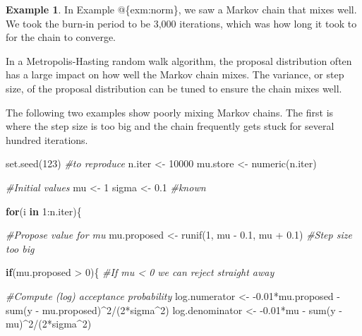 \documentclass[
]{book}
\newenvironment{Shaded}{\begin{snugshade}}{\end{snugshade}}
\newcommand{\CommentTok}[1]{\textcolor[rgb]{0.56,0.35,0.01}{\textit{#1}}}
\newcommand{\ControlFlowTok}[1]{\textcolor[rgb]{0.13,0.29,0.53}{\textbf{#1}}}
\newcommand{\DecValTok}[1]{\textcolor[rgb]{0.00,0.00,0.81}{#1}}
\newcommand{\FloatTok}[1]{\textcolor[rgb]{0.00,0.00,0.81}{#1}}
\newcommand{\FunctionTok}[1]{\textcolor[rgb]{0.00,0.00,0.00}{#1}}
\newcommand{\NormalTok}[1]{#1}
\newcommand{\OtherTok}[1]{\textcolor[rgb]{0.56,0.35,0.01}{#1}}
\newcommand{\SpecialCharTok}[1]{\textcolor[rgb]{0.00,0.00,0.00}{#1}}
\theoremstyle{definition}
\theoremstyle{definition}
\newtheorem{example}{Example}[chapter]
\theoremstyle{definition}
\theoremstyle{definition}
\theoremstyle{remark}
\begin{document}
\begin{example}
In Example @\{exm:norm\}, we saw a Markov chain that mixes well. We took the burn-in period to be 3,000 iterations, which was how long it took to for the chain to converge.

In a Metropolis-Hasting random walk algorithm, the proposal distribution often has a large impact on how well the Markov chain mixes. The variance, or step size, of the proposal distribution can be tuned to ensure the chain mixes well.

The following two examples show poorly mixing Markov chains. The first is where the step size is too big and the chain frequently gets stuck for several hundred iterations.

\begin{Shaded}
\begin{Highlighting}[]
\FunctionTok{set.seed}\NormalTok{(}\DecValTok{123}\NormalTok{) }\CommentTok{\#to reproduce}
\NormalTok{n.iter   }\OtherTok{\textless{}{-}} \DecValTok{10000}
\NormalTok{mu.store }\OtherTok{\textless{}{-}} \FunctionTok{numeric}\NormalTok{(n.iter)}

\CommentTok{\#Initial values}
\NormalTok{mu }\OtherTok{\textless{}{-}} \DecValTok{1} 
\NormalTok{sigma }\OtherTok{\textless{}{-}} \FloatTok{0.1} \CommentTok{\#known}

\ControlFlowTok{for}\NormalTok{(i }\ControlFlowTok{in} \DecValTok{1}\SpecialCharTok{:}\NormalTok{n.iter)\{}
  
  \CommentTok{\#Propose value for mu}
\NormalTok{  mu.proposed }\OtherTok{\textless{}{-}} \FunctionTok{runif}\NormalTok{(}\DecValTok{1}\NormalTok{, mu }\SpecialCharTok{{-}} \FloatTok{0.1}\NormalTok{, mu }\SpecialCharTok{+} \FloatTok{0.1}\NormalTok{) }\CommentTok{\#Step size too big}
  
  \ControlFlowTok{if}\NormalTok{(mu.proposed }\SpecialCharTok{\textgreater{}} \DecValTok{0}\NormalTok{)\{ }\CommentTok{\#If mu \textless{} 0 we can reject straight away}
    
    \CommentTok{\#Compute (log) acceptance probability}
\NormalTok{    log.numerator   }\OtherTok{\textless{}{-}} \SpecialCharTok{{-}}\FloatTok{0.01}\SpecialCharTok{*}\NormalTok{mu.proposed }\SpecialCharTok{{-}} \FunctionTok{sum}\NormalTok{(y }\SpecialCharTok{{-}}\NormalTok{ mu.proposed)}\SpecialCharTok{\^{}}\DecValTok{2}\SpecialCharTok{/}\NormalTok{(}\DecValTok{2}\SpecialCharTok{*}\NormalTok{sigma}\SpecialCharTok{\^{}}\DecValTok{2}\NormalTok{)}
\NormalTok{    log.denominator }\OtherTok{\textless{}{-}} \SpecialCharTok{{-}}\FloatTok{0.01}\SpecialCharTok{*}\NormalTok{mu }\SpecialCharTok{{-}} \FunctionTok{sum}\NormalTok{(y }\SpecialCharTok{{-}}\NormalTok{ mu)}\SpecialCharTok{\^{}}\DecValTok{2}\SpecialCharTok{/}\NormalTok{(}\DecValTok{2}\SpecialCharTok{*}\NormalTok{sigma}\SpecialCharTok{\^{}}\DecValTok{2}\NormalTok{)}
    

\end{Highlighting}
\end{Shaded}
\end{example}
\end{document}
